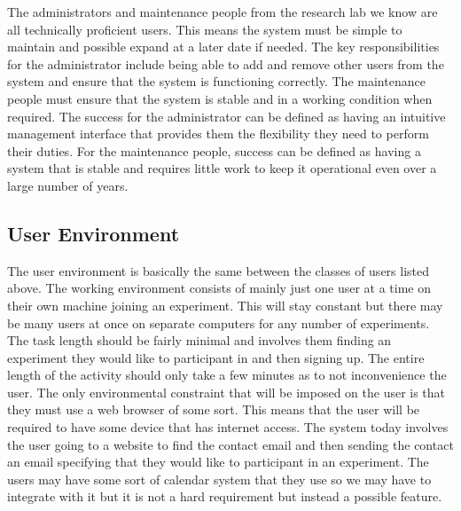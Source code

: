 The administrators and maintenance people from the research lab we know are all technically proficient users. This means the system must be simple to maintain and possible expand at a later date if needed. The key responsibilities for the administrator include being able to add and remove other users from the system and ensure that the system is functioning correctly. The maintenance people must ensure that the system is stable and in a working condition when required. The success for the administrator can be defined as having an intuitive management interface that provides them the flexibility they need to perform their duties. For the maintenance people, success can be defined as having a system that is stable and requires little work to keep it operational even over a large number of years.

\subsection{User Environment}
The user environment is basically the same between the classes of users listed above. The working environment consists of mainly just one user at a time on their own machine joining an experiment. This will stay constant but there may be many users at once on separate computers for any number of experiments. The task length should be fairly minimal and involves them finding an experiment they would like to participant in and then signing up. The entire length of the activity should only take a few minutes as to not inconvenience the user. The only environmental constraint that will be imposed on the user is that they must use a web browser of some sort. This means that the user will be required to have some device that has internet access. The system today involves the user going to a website to find the contact email and then sending the contact an email specifying that they would like to participant in an experiment. The users may have some sort of calendar system that they use so we may have to integrate with it but it is not a hard requirement but instead a possible feature.

